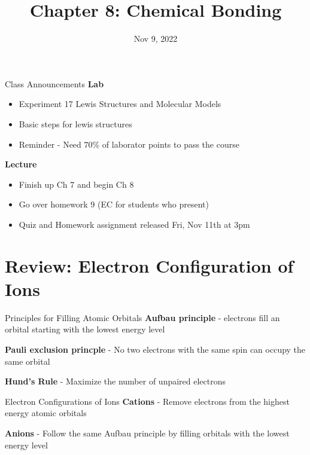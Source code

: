\documentclass[11pt]{beamer}
\title{Chapter 8: Chemical Bonding}
\institute{Chemistry Department, Cypress College}
\date{Nov 9, 2022}
\begin{document}
\begin{frame}
  \titlepage
\end{frame}

\begin{frame}{Class Announcements}
  \textbf{Lab}
  \begin{itemize}
  \item Experiment 17 Lewis Structures and Molecular Models
  \item Basic steps for lewis structures
  \item Reminder - Need $70\%$ of laborator points to pass
    the course
  \end{itemize}

  \textbf{Lecture}
  \begin{itemize}
  \item Finish up Ch 7 and begin Ch 8
  \item Go over homework 9 (EC for students who present)
  \item Quiz and Homework assignment released Fri, Nov 11th at 3pm
  \end{itemize}
\end{frame}

\section{Review: Electron Configuration of Ions}

\begin{frame}{Principles for Filling Atomic Orbitals}
  \textbf{Aufbau principle} - electrons fill an orbital starting with
  the lowest energy level

  \textbf{Pauli exclusion princple} - No two electrons with the same
  spin can occupy the same orbital

  \textbf{Hund's Rule} - Maximize the number of unpaired electrons
\end{frame}

\begin{frame}{Electron Configurations of Ions}
  \textbf{Cations} - Remove electrons from the highest energy atomic
  orbitals

  \textbf{Anions} - Follow the same Aufbau principle by filling orbitals
  with the lowest energy level

\end{frame}
\end{document}
